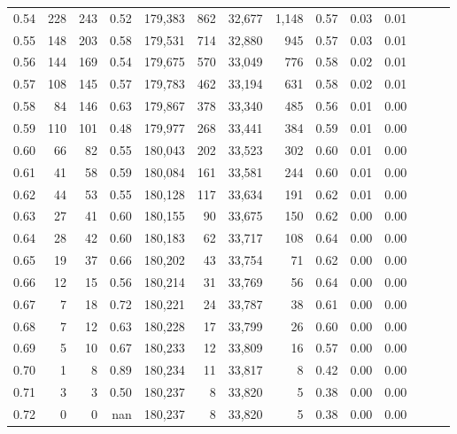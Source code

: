 \begin{tabular}{rrrrrrrrrrrrrr}
0.54 &    228 &    243 &  0.52 &  179,383 &      862 &  32,677 &   1,148 &  0.57 &  0.03 &      0.01 \\
0.55 &    148 &    203 &  0.58 &  179,531 &      714 &  32,880 &     945 &  0.57 &  0.03 &      0.01 \\
0.56 &    144 &    169 &  0.54 &  179,675 &      570 &  33,049 &     776 &  0.58 &  0.02 &      0.01 \\
0.57 &    108 &    145 &  0.57 &  179,783 &      462 &  33,194 &     631 &  0.58 &  0.02 &      0.01 \\
0.58 &     84 &    146 &  0.63 &  179,867 &      378 &  33,340 &     485 &  0.56 &  0.01 &      0.00 \\
0.59 &    110 &    101 &  0.48 &  179,977 &      268 &  33,441 &     384 &  0.59 &  0.01 &      0.00 \\
0.60 &     66 &     82 &  0.55 &  180,043 &      202 &  33,523 &     302 &  0.60 &  0.01 &      0.00 \\
0.61 &     41 &     58 &  0.59 &  180,084 &      161 &  33,581 &     244 &  0.60 &  0.01 &      0.00 \\
0.62 &     44 &     53 &  0.55 &  180,128 &      117 &  33,634 &     191 &  0.62 &  0.01 &      0.00 \\
0.63 &     27 &     41 &  0.60 &  180,155 &       90 &  33,675 &     150 &  0.62 &  0.00 &      0.00 \\
0.64 &     28 &     42 &  0.60 &  180,183 &       62 &  33,717 &     108 &  0.64 &  0.00 &      0.00 \\
0.65 &     19 &     37 &  0.66 &  180,202 &       43 &  33,754 &      71 &  0.62 &  0.00 &      0.00 \\
0.66 &     12 &     15 &  0.56 &  180,214 &       31 &  33,769 &      56 &  0.64 &  0.00 &      0.00 \\
0.67 &      7 &     18 &  0.72 &  180,221 &       24 &  33,787 &      38 &  0.61 &  0.00 &      0.00 \\
0.68 &      7 &     12 &  0.63 &  180,228 &       17 &  33,799 &      26 &  0.60 &  0.00 &      0.00 \\
0.69 &      5 &     10 &  0.67 &  180,233 &       12 &  33,809 &      16 &  0.57 &  0.00 &      0.00 \\
0.70 &      1 &      8 &  0.89 &  180,234 &       11 &  33,817 &       8 &  0.42 &  0.00 &      0.00 \\
0.71 &      3 &      3 &  0.50 &  180,237 &        8 &  33,820 &       5 &  0.38 &  0.00 &      0.00 \\
0.72 &      0 &      0 &   nan &  180,237 &        8 &  33,820 &       5 &  0.38 &  0.00 &      0.00 \\

\end{tabular}
